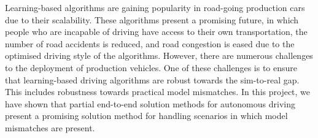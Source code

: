 Learning-based algorithms are gaining popularity in road-going production cars due to their scalability.
These algorithms present a promising future, in which people who are incapable of driving have access to their own transportation, 
the number of road accidents is reduced, and road congestion is eased due to the optimised driving style of the algorithms.
However, there are numerous challenges to the deployment of production vehicles.
One of these challenges is to ensure that learning-based driving algorithms are robust towards the sim-to-real gap.
This includes robustness towards practical model mismatches.
In this project, we have shown that partial end-to-end solution methods for autonomous driving present a promising solution method for handling scenarios in which model mismatches are present.

